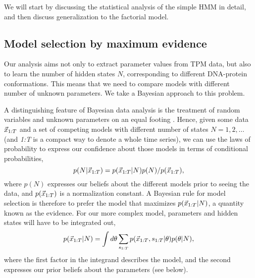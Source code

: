 We will start by discussing the statistical analysis of the simple HMM
in detail, and then discuss generalization to the factorial model.
\subsection{Model selection by maximum evidence}
Our analysis aims not only to extract parameter values from TPM data,
but also to learn the number of hidden states $N$, corresponding to
different DNA-protein conformations. This means that we need to
compare models with different number of unknown parameters.  We take a
Bayesian approach to this problem.

A distinguishing feature of Bayesian data analysis is the treatment of
random variables and unknown parameters on an equal footing
\cite{eddy2004,mackay2003}. 
Hence, given some data $\vec{x}_{1:T}$ and a set of competing models with
different number of states $N=1,2,\ldots$ (and \mbox{\textit{1:T}} is
a compact way to denote a whole time series), we can use the laws
of probability to express our confidence about those models in terms
of conditional probabilities,
\begin{equation}
  p(N|\vec{x}_{1:T})=p(\vec{x}_{1:T}|N)p(N)/p(\vec{x}_{1:T}),
\end{equation}
where $p(N)$ expresses our beliefs about the different models prior to
seeing the data, and $p(\vec{x}_{1:T})$ is a normalization constant. A
Bayesian rule for model selection is therefore to prefer the model
that maximizes $p(\vec{x}_{1:T}|N)$, a quantity known as the evidence. For
our more complex model, parameters and hidden states will have to be
integrated out,
\begin{equation}\label{eq:evidencedef}
  p(\vec{x}_{1:T}|N)=\int d\theta\sum_{s_{1:T}} p(\vec{x}_{1:T},s_{1:T}|\theta)p(\theta|N),
\end{equation}
where the first factor in the integrand describes the model, and the
second expresses our prior beliefs about the parameters (see
below).

